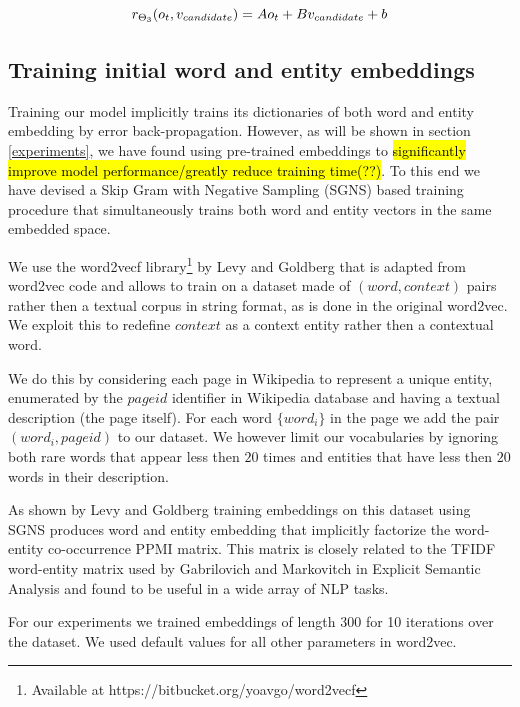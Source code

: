 \documentclass[11pt]{article}
\begin{document}
\begin{equation}
\label{eq3}
r_{\Theta_3}(o_t, v_{candidate}) = Ao_t + Bv_{candidate} + b \\
\end{equation}


\subsection{Training initial word and entity embeddings}

Training our model implicitly trains its dictionaries of both word and entity embedding by error back-propagation. However, as will be shown in section \ref{experiments}, we have found using pre-trained embeddings to \hl{significantly improve model performance/greatly reduce training time(??)}. To this end we have devised a Skip Gram with Negative Sampling (SGNS) \cite{mikolov2013distributed} based training procedure that simultaneously trains both word and entity vectors in the same embedded space.

We use the word2vecf library\footnote{Available at https://bitbucket.org/yoavgo/word2vecf} by Levy and Goldberg  that is adapted from word2vec code and allows to train on a dataset made of $(word,context)$ pairs rather then a textual corpus in string format, as is done in the original word2vec. We exploit this to redefine $context$ as a context entity rather then a contextual word. 

We do this by considering each page in Wikipedia to represent a unique entity, enumerated by the $pageid$ identifier in Wikipedia database and having a textual description (the page itself). For each word $\{word_i\}$ in the page we add the pair $(word_i,pageid)$ to our dataset. We however limit our vocabularies by ignoring both rare words that appear less then $20$ times and entities that have less then $20$ words in their description.
	
As shown by Levy and Goldberg  training embeddings on this dataset using SGNS produces word and entity embedding that implicitly factorize the word-entity co-occurrence PPMI matrix. This matrix is closely related to the TFIDF word-entity matrix used by Gabrilovich and Markovitch  in Explicit Semantic Analysis and found to be useful in a wide array of NLP tasks. 

For our experiments we trained embeddings of length 300 for 10 iterations over the dataset. We used default values for all other parameters in word2vec.
\end{document}
